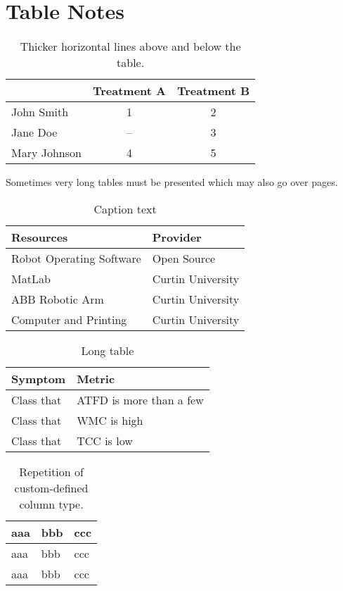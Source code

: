 
\section{Table Notes}


\begin{table}[ht]
\centering
\caption{Thicker horizontal lines above and below the table.}
\begin{tabular}{lcc}
\toprule
&Treatment A&Treatment B\\ 
\hline
John Smith&1&2\\
Jane Doe&--&3\\
Mary Johnson&4&5\\
\bottomrule
\end{tabular}
\end{table}%


Sometimes very long tables must be presented which may also go over pages. \\


\begin{table}[ht!]
     \centering
     \caption{Caption text} 
     \begin{tabular}{|p{5cm}|p{5cm}|}
        \toprule 	
	\bfseries{Resources} &\bfseries{Provider}\\ \hline
	Robot Operating Software & Open Source\\
	MatLab                  & Curtin University\\
	ABB Robotic Arm         & Curtin University\\
	Computer and Printing   & Curtin University\\
	\bottomrule
      \end{tabular}
    \end{table}
    
\begin{table}[h]
 \centering
     \caption{Long table} 
\begin{tabularx}{\textwidth}{X|l}
  \textbf{Symptom} & \textbf{Metric} \\
\hline
Class that & ATFD is more than a few\\
Class that & WMC is high\\
Class that & TCC is low\\
\end{tabularx}
\end{table}


\begin{table}[ht]
\caption{Repetition of custom-defined column type.}
\begin{center}
\begin{tabular}{*{3}{V}}
\hline
aaa&bbb&ccc\\
\hline
aaa&bbb&ccc\\
aaa&bbb&ccc\\
\hline
\end{tabular}
\end{center}
\end{table}
